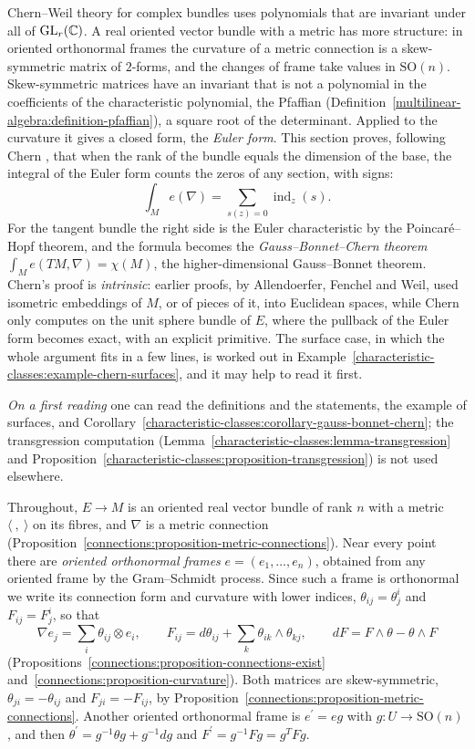 Chern--Weil theory for complex bundles uses polynomials that are invariant under all of $\mathrm{GL}_r(\mathbb{C})$. A real oriented vector bundle with a metric has more structure: in oriented
orthonormal frames the curvature of a metric connection is a skew-symmetric matrix of $2$-forms, and the changes of frame take values in $\mathrm{SO}(n)$. Skew-symmetric matrices have
an invariant that is not a polynomial in the coefficients of the characteristic polynomial, the Pfaffian (Definition~\ref{multilinear-algebra:definition-pfaffian}), a square root of the
determinant. Applied to the curvature it gives a closed form, the \emph{Euler form}. This section proves, following Chern \cite{chern-1944}, that when the rank of the bundle equals the
dimension of the base, the integral of the Euler form counts the zeros of any section, with signs:
\[
\int_Me(\nabla) = \sum_{s(z) = 0}\operatorname{ind}_z(s) .
\]
For the tangent bundle the right side is the Euler characteristic by the Poincar\'e--Hopf theorem, and the formula becomes the \emph{Gauss--Bonnet--Chern theorem}
$\int_Me(TM, \nabla) = \chi(M)$, the higher-dimensional Gauss--Bonnet theorem. Chern's proof is \emph{intrinsic}: earlier proofs, by Allendoerfer, Fenchel and Weil, used isometric embeddings of $M$, or of
pieces of it, into Euclidean spaces, while Chern only computes on the unit sphere bundle of $E$, where the pullback of the Euler form becomes exact, with an explicit primitive. The surface case, in which the whole argument fits in a few
lines, is worked out in Example~\ref{characteristic-classes:example-chern-surfaces}, and it may help to read it first.

\emph{On a first reading} one can read the definitions and the statements, the example of surfaces, and Corollary~\ref{characteristic-classes:corollary-gauss-bonnet-chern}; the
transgression computation (Lemma~\ref{characteristic-classes:lemma-transgression} and Proposition~\ref{characteristic-classes:proposition-transgression}) is not used elsewhere.

Throughout, $E \to M$ is an oriented real vector bundle of rank $n$ with a metric $\langle\ ,\ \rangle$ on its fibres, and $\nabla$ is a metric connection
(Proposition~\ref{connections:proposition-metric-connections}). Near every point there are \emph{oriented orthonormal frames} $e = (e_1, \ldots, e_n)$, obtained from any oriented frame by
the Gram--Schmidt process. Since such a frame is orthonormal we write its connection form and curvature with lower indices, $\theta_{ij} = \theta^i_j$ and $F_{ij} = F^i_j$, so that
\[
\nabla e_j = \sum_i\theta_{ij} \otimes e_i, \qquad F_{ij} = d\theta_{ij} + \sum_k\theta_{ik} \wedge \theta_{kj}, \qquad dF = F \wedge \theta - \theta \wedge F
\]
(Propositions~\ref{connections:proposition-connections-exist} and~\ref{connections:proposition-curvature}). Both matrices are skew-symmetric, $\theta_{ji} = -\theta_{ij}$ and
$F_{ji} = -F_{ij}$, by Proposition~\ref{connections:proposition-metric-connections}. Another oriented orthonormal frame is $e^{\prime} = eg$ with $g \colon U \to \mathrm{SO}(n)$, and then
$\theta^{\prime} = g^{-1}\theta g + g^{-1}dg$ and $F^{\prime} = g^{-1}Fg = g^TFg$.

